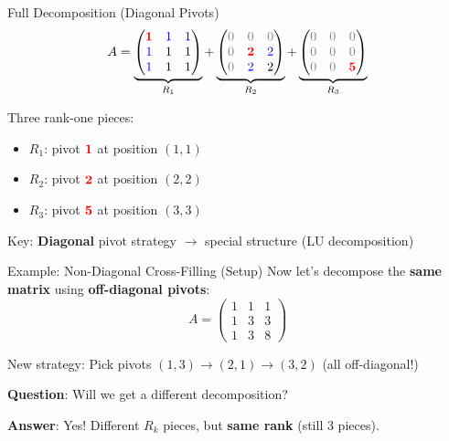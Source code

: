 \documentclass[10pt]{beamer}
\theoremstyle{definition}
\newcommand{\pvt}[1]{{\color{red}\mathbf{#1}}}       %
\newcommand{\crs}[1]{{\color{blue}#1}}                %
\newcommand{\rem}[1]{{\color{gray}#1}}                %
\newcommand{\x}[1]{\alert{\textbf{#1}}}
\begin{document}
\begin{frame}{Full Decomposition (Diagonal Pivots)}
$$A = \underbrace{\begin{pmatrix}
\pvt{1} & \crs{1} & \crs{1} \\
\crs{1} & 1 & 1 \\
\crs{1} & 1 & 1
\end{pmatrix}}_{R_1}
+ \underbrace{\begin{pmatrix}
\rem{0} & \rem{0} & \rem{0} \\
\rem{0} & \pvt{2} & \crs{2} \\
\rem{0} & \crs{2} & 2
\end{pmatrix}}_{R_2}
+ \underbrace{\begin{pmatrix}
\rem{0} & \rem{0} & \rem{0} \\
\rem{0} & \rem{0} & \rem{0} \\
\rem{0} & \rem{0} & \pvt{5}
\end{pmatrix}}_{R_3}$$

\vfill
Three rank-one pieces:
\begin{itemize}
\item $R_1$: pivot $\pvt{1}$ at position $(1,1)$
\item $R_2$: pivot $\pvt{2}$ at position $(2,2)$
\item $R_3$: pivot $\pvt{5}$ at position $(3,3)$
\end{itemize}

\vfill
Key: \x{Diagonal} pivot strategy $\to$ special structure (LU decomposition)
\end{frame}

\begin{frame}{Example: Non-Diagonal Cross-Filling (Setup)}
Now let's decompose the \x{same matrix} using \x{off-diagonal pivots}:
$$A = \begin{pmatrix}
1 & 1 & 1 \\
1 & 3 & 3 \\
1 & 3 & 8
\end{pmatrix}$$

\vfill
New strategy: Pick pivots $(1,3) \to (2,1) \to (3,2)$ (all off-diagonal!)

\vfill
\textbf{Question}: Will we get a different decomposition?

\vfill
\textbf{Answer}: Yes! Different $R_k$ pieces, but \x{same rank} (still 3 pieces).
\end{frame}
\end{document}
